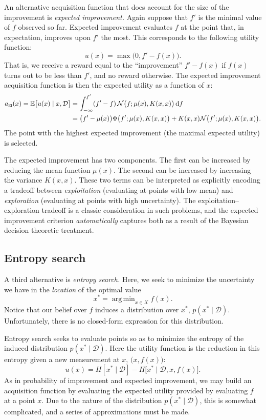\documentclass{article}
\newcommand{\acro}[1]{\textsc{\MakeLowercase{#1}}}
\newcommand{\given}{\mid}
\newcommand{\mc}[1]{\mathcal{#1}}
\newcommand{\data}{\mc{D}}
\newcommand{\intd}[1]{\,\mathrm{d}{#1}}
\DeclareMathOperator*{\argmin}{arg\,min}
\begin{document}
An alternative acquisition function that does account for the size of
the improvement is \emph{expected improvement.}  Again suppose that
$f'$ is the minimal value of $f$ observed so far.  Expected
improvement evaluates $f$ at the point that, in expectation, improves
upon $f'$ the most.  This corresponds to the following utility
function:
\[
  u(x)
  =
  \max\bigl(0, f' - f(x)\bigr).
\]
That is, we receive a reward equal to the ``improvement'' $f' - f(x)$
if $f(x)$ turns out to be less than $f'$, and no reward otherwise.
The expected improvement acquisition function is then the expected
utility as a function of $x$:
\begin{align*}
  a_{\text{\acro{EI}}}(x)
  =
  \mathbb{E}\bigl[ u(x) \given x, \data \bigr]
  &=
  \int_{-\infty}^{f'}
  (f' - f)
  \,
  \mc{N}\bigl(f; \mu(x), K(x, x)\bigr)
  \intd{f}
  \\
  &=
  \bigl(f' - \mu(x)\bigr)
  \Phi\bigl(f'; \mu(x), K(x, x)\bigr)
  +
  K(x, x)
  \mc{N}\bigl(f'; \mu(x), K(x, x)\bigr).
\end{align*}
The point with the highest expected improvement (the maximal expected
utility) is selected.

The expected improvement has two components.  The first can be
increased by reducing the mean function $\mu(x)$.  The second can be
increased by increasing the variance $K(x, x)$.  These two terms can
be interpreted as explicitly encoding a tradeoff between
\emph{exploitation} (evaluating at points with low mean) and
\emph{exploration} (evaluating at points with high uncertainty).  The
exploitation--exploration tradeoff is a classic consideration in such
problems, and the expected improvement criterion \emph{automatically}
captures both as a result of the Bayesian decision theoretic
treatment.

\subsection*{Entropy search}

A third alternative is \emph{entropy search.}  Here, we seek to
minimize the uncertainty we have in the \emph{location} of the optimal
value
\[
  x^\ast = \argmin_{x \in X} f(x).
\]
Notice that our belief over $f$ induces a distribution over $x^\ast$,
$p(x^\ast \given \data)$.  Unfortunately, there is no closed-form
expression for this distribution.

Entropy search seeks to evaluate points so as to minimize the entropy
of the induced distribution $p(x^\ast \given \data)$.  Here the
utility function is the reduction in this entropy given a new
measurement at $x$, $\bigl(x, f(x)\bigr)$:
\[
  u(x)
  =
  H[x^\ast \given \data]
  -
  H\bigl[x^\ast \given \data, x, f(x)\bigr].
\]
As in probability of improvement and expected improvement, we may
build an acquisition function by evaluating the expected utility
provided by evaluating $f$ at a point $x$.  Due to the nature of the
distribution $p(x^\ast \given \data)$, this is somewhat complicated,
and a series of approximations must be made.
\end{document}
